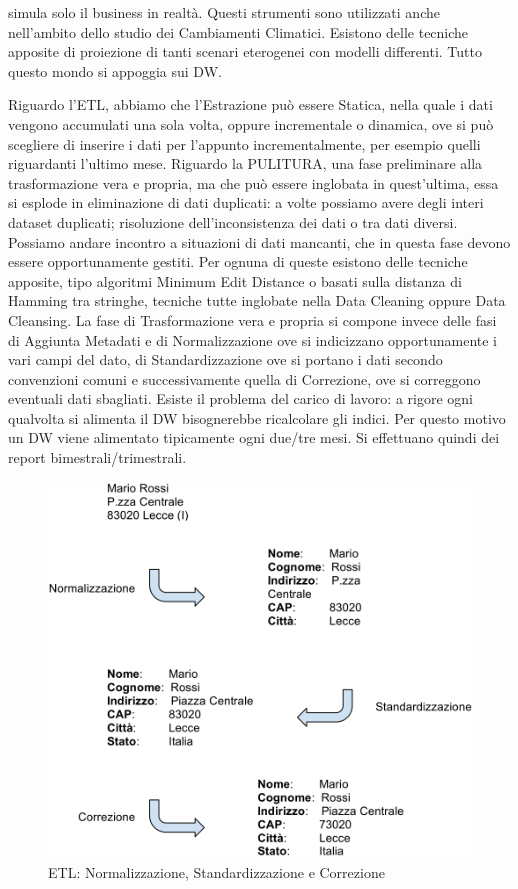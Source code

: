 simula solo il business in realtà. Questi strumenti sono utilizzati anche nell'ambito dello studio dei Cambiamenti Climatici. Esistono delle tecniche apposite di proiezione di tanti scenari eterogenei con modelli differenti. Tutto questo mondo si appoggia sui DW. 
 
Riguardo l'ETL, abbiamo che l'Estrazione può essere Statica, nella quale i dati vengono accumulati una sola volta, oppure incrementale o dinamica, ove si può scegliere di inserire i dati per l'appunto incrementalmente, per esempio quelli riguardanti l'ultimo mese. Riguardo la PULITURA, una fase preliminare alla trasformazione vera e propria, ma che può essere inglobata in quest'ultima, essa si esplode in eliminazione di dati duplicati: a volte possiamo avere degli interi dataset duplicati; risoluzione dell'inconsistenza dei dati o tra dati diversi. Possiamo andare incontro a situazioni di dati mancanti, che in questa fase devono essere opportunamente gestiti. Per ognuna di queste esistono delle tecniche apposite, tipo algoritmi Minimum Edit Distance o basati sulla distanza di Hamming tra stringhe, tecniche tutte inglobate nella Data Cleaning oppure Data Cleansing. La fase di Trasformazione vera e propria si compone invece delle fasi di Aggiunta Metadati e di Normalizzazione ove si indicizzano opportunamente i vari campi del dato, di Standardizzazione ove si portano i dati secondo convenzioni comuni e successivamente quella di Correzione, ove si correggono eventuali dati sbagliati. Esiste il problema del carico di lavoro: a rigore ogni qualvolta si alimenta il DW bisognerebbe ricalcolare gli indici. Per questo motivo un DW viene alimentato tipicamente ogni due/tre mesi. Si effettuano quindi dei report bimestrali/trimestrali. 

\begin{center}
\begin{figure}[H]
\centering
\includegraphics[scale=0.8]{figures/etl.png}
\caption{ETL: Normalizzazione, Standardizzazione e Correzione}
\end{figure}
\end{center}

